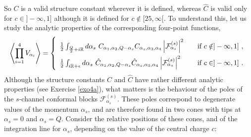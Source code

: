\documentclass[12pt, a4paper, notitlepage, twoside]{report}
\numberwithin{equation}{section}
\theoremstyle{break}
\begin{document}
So $C$ is a valid structure constant wherever it is defined, whereas $\hat C$ is valid only for $c\in ]-\infty, 1]$ although it is defined for $c\notin [25,\infty[$.
To understand this, let us study the analytic properties of the corresponding four-point functions,
\begin{align}
\renewcommand{\arraystretch}{2}
 \left< \prod_{i=1}^4 V_{\alpha_i}\right> = 
 \left\{\begin{array}{ll} 
         \frac12 \int_{\frac{Q}{2}+i\mathbb{R}} d\alpha_s\ C_{\alpha_1,\alpha_2,Q-\alpha_s} C_{\alpha_s,\alpha_3, \alpha_4} \left|\mathcal{F}_{\alpha_s}^{(s)} \right|^2 \quad & \text{if } c\notin ]-\infty, 1]\ ,
         \\
         \frac12 \int_{i\mathbb{R}+\epsilon} d\alpha_s\ \hat C_{\alpha_1,\alpha_2,Q-\alpha_s} \hat C_{\alpha_s,\alpha_3, \alpha_4} \left|\mathcal{F}_{\alpha_s}^{(s)} \right|^2 \quad & \text{if } c\in ]-\infty, 1]\ .
        \end{array}
 \right.
 \label{vfcch}
\end{align}
Although the structure constants $C$ and $\hat C$ have rather different analytic properties (see Exercise \ref{exo4a}), what matters is the behaviour of the poles of the $s$-channel conformal blocks $\mathcal{F}_{\alpha_s}^{(s)}$. 
These poles correspond to degenerate values of the momentum $\alpha_s$, and are therefore found in two cones with tips at $\alpha_s= 0$ and $\alpha_s = Q$. 
Consider the relative positions of these cones, and of the integration line for $\alpha_s$, depending on the value of the central charge $c$:
\end{document}
